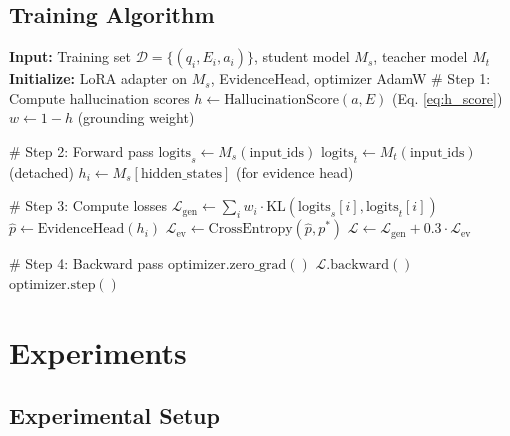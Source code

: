 \documentclass[11pt,a4paper]{article}
\begin{document}
\subsection{Training Algorithm}

\begin{algorithm}
\caption{HAD: Hallucination-Aware Distillation}
\begin{algorithmic}[1]
\State \textbf{Input:} Training set $\mathcal{D} = \{(q_i, E_i, a_i)\}$, student model $M_s$, teacher model $M_t$
\State \textbf{Initialize:} LoRA adapter on $M_s$, EvidenceHead, optimizer AdamW
        \State \# Step 1: Compute hallucination scores
            \State $h \gets \text{HallucinationScore}(a, E)$ \quad (Eq. \ref{eq:h_score})
            \State $w \gets 1 - h$ \quad (grounding weight)
        \EndFor
        
        \State \# Step 2: Forward pass
        \State $\text{logits}_s \gets M_s(\text{input\_ids})$
        \State $\text{logits}_t \gets M_t(\text{input\_ids})$ \quad (detached)
        \State $h_i \gets M_s[\text{hidden\_states}]$ \quad (for evidence head)
        
        \State \# Step 3: Compute losses
        \State $\mathcal{L}_{\text{gen}} \gets \sum_i w_i \cdot \text{KL}(\text{logits}_s[i], \text{logits}_t[i])$
        \State $\hat{p} \gets \text{EvidenceHead}(h_i)$
        \State $\mathcal{L}_{\text{ev}} \gets \text{CrossEntropy}(\hat{p}, p^*)$
        \State $\mathcal{L} \gets \mathcal{L}_{\text{gen}} + 0.3 \cdot \mathcal{L}_{\text{ev}}$
        
        \State \# Step 4: Backward pass
        \State $\text{optimizer.zero\_grad}()$
        \State $\mathcal{L}.\text{backward}()$
        \State $\text{optimizer.step}()$
    \EndFor
\EndFor
\end{algorithmic}
\end{algorithm}

\section{Experiments}
\label{sec:experiments}

\subsection{Experimental Setup}
\end{document}
